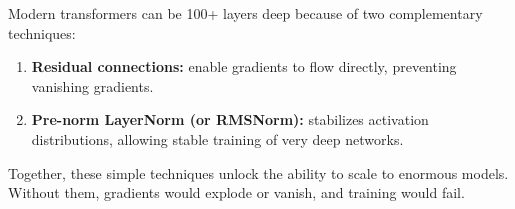 \begin{paperbox}[title={Key Takeaway: Depth Through Residuals and Normalization}]
Modern transformers can be 100+ layers deep because of two complementary techniques:

\begin{enumerate}
  \item \textbf{Residual connections:} enable gradients to flow directly, preventing vanishing gradients.
  \item \textbf{Pre-norm LayerNorm (or RMSNorm):} stabilizes activation distributions, allowing stable training of very deep networks.
\end{enumerate}

Together, these simple techniques unlock the ability to scale to enormous models. Without them, gradients would explode or vanish, and training would fail.
\end{paperbox}
